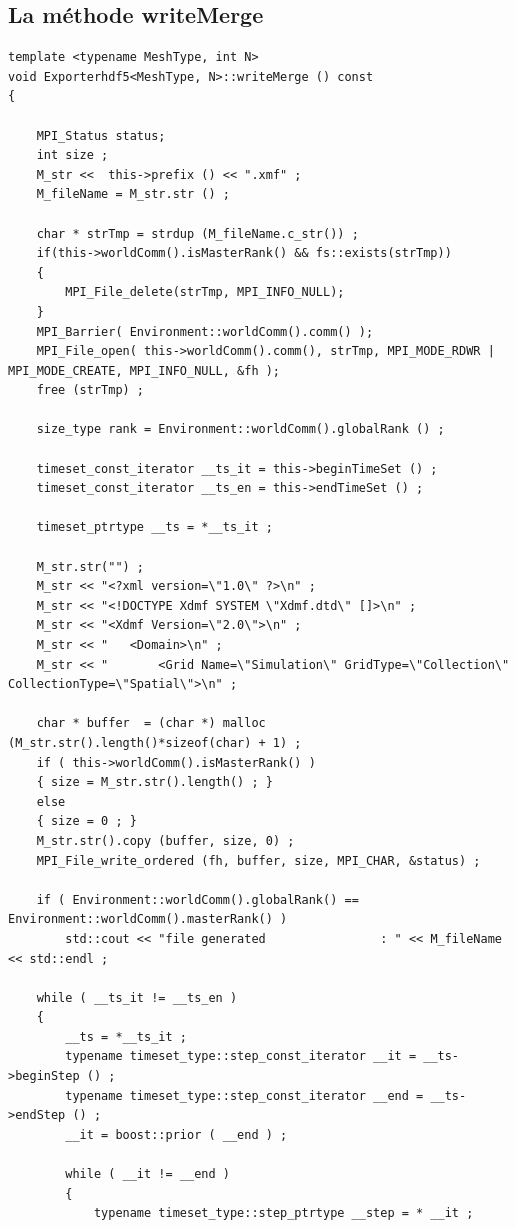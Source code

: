 \documentclass[12pt]{article}
\begin{document}
\subsection {La méthode writeMerge}
\begin{lstlisting}
template <typename MeshType, int N>
void Exporterhdf5<MeshType, N>::writeMerge () const 
{

    MPI_Status status;
    int size ;
    M_str <<  this->prefix () << ".xmf" ;
    M_fileName = M_str.str () ; 

    char * strTmp = strdup (M_fileName.c_str()) ;
    if(this->worldComm().isMasterRank() && fs::exists(strTmp))
    {
        MPI_File_delete(strTmp, MPI_INFO_NULL);
    }
    MPI_Barrier( Environment::worldComm().comm() );
    MPI_File_open( this->worldComm().comm(), strTmp, MPI_MODE_RDWR | MPI_MODE_CREATE, MPI_INFO_NULL, &fh );
    free (strTmp) ;

    size_type rank = Environment::worldComm().globalRank () ;

    timeset_const_iterator __ts_it = this->beginTimeSet () ;
    timeset_const_iterator __ts_en = this->endTimeSet () ;

    timeset_ptrtype __ts = *__ts_it ;

    M_str.str("") ;
    M_str << "<?xml version=\"1.0\" ?>\n" ;
    M_str << "<!DOCTYPE Xdmf SYSTEM \"Xdmf.dtd\" []>\n" ;
    M_str << "<Xdmf Version=\"2.0\">\n" ;
    M_str << "   <Domain>\n" ;
    M_str << "       <Grid Name=\"Simulation\" GridType=\"Collection\" CollectionType=\"Spatial\">\n" ;

    char * buffer  = (char *) malloc (M_str.str().length()*sizeof(char) + 1) ;
    if ( this->worldComm().isMasterRank() ) 
    { size = M_str.str().length() ; }
    else
    { size = 0 ; }
    M_str.str().copy (buffer, size, 0) ;
    MPI_File_write_ordered (fh, buffer, size, MPI_CHAR, &status) ;

    if ( Environment::worldComm().globalRank() == Environment::worldComm().masterRank() )
        std::cout << "file generated                : " << M_fileName << std::endl ;

    while ( __ts_it != __ts_en )
    {
        __ts = *__ts_it ;
        typename timeset_type::step_const_iterator __it = __ts->beginStep () ;
        typename timeset_type::step_const_iterator __end = __ts->endStep () ;
        __it = boost::prior ( __end ) ;

        while ( __it != __end )
        {
            typename timeset_type::step_ptrtype __step = * __it ;


\end{lstlisting}
\end{document}
